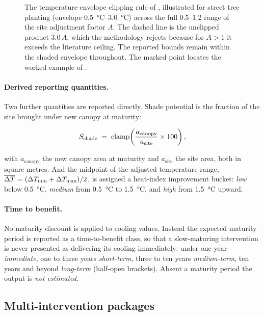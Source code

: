 \begin{figure}[htbp]
\centering

\caption[The temperature-envelope clipping rule]{The temperature-envelope
clipping rule of , illustrated for street tree planting
(envelope \SIrange{0.5}{3.0}{\degreeCelsius}) across the full
\numrange{0.5}{1.2} range of the site adjustment factor $A$. The dashed line is
the unclipped product $3.0\,A$, which the methodology rejects because for
$A > 1$ it exceeds the literature ceiling. The reported bounds remain within
the shaded envelope throughout. The marked point locates the worked example of
.}
\label{fig:clipping}
\end{figure}

\paragraph{Derived reporting quantities.} Two further quantities are reported
directly. Shade potential is the fraction of the site brought under new canopy
at maturity:

\begin{equation}
\label{eq:shade}
S_{\mathrm{shade}} \;=\; \operatorname{clamp}\!\left(\frac{a_{\mathrm{canopy}}}{a_{\mathrm{site}}}\times 100\right),
\end{equation}

with $a_{\mathrm{canopy}}$ the new canopy area at maturity and
$a_{\mathrm{site}}$ the site area, both in square metres. And the midpoint of
the adjusted temperature range,
$\overline{\Delta T} = (\Delta T_{\min} + \Delta T_{\max})/2$, is assigned a heat-index
improvement bucket: \emph{low} below \qty{0.5}{\degreeCelsius}, \emph{medium}
from \qty{0.5}{\degreeCelsius} to \qty{1.5}{\degreeCelsius}, and \emph{high}
from \qty{1.5}{\degreeCelsius} upward.

\paragraph{Time to benefit.} No maturity discount is applied to cooling values.
Instead the expected maturity period is reported as a time-to-benefit class, so
that a slow-maturing intervention is never presented as delivering its cooling
immediately: under one year \emph{immediate}, one to three years
\emph{short-term}, three to ten years \emph{medium-term}, ten years and beyond
\emph{long-term} (half-open brackets). Absent a maturity period the output is
\emph{not estimated}.

\subsection{Multi-intervention packages}
\label{sec:packages}

